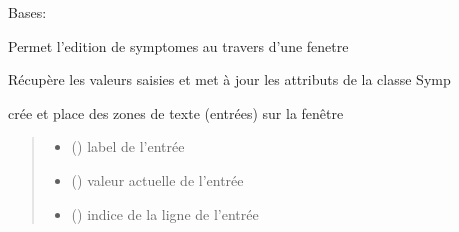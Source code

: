 \documentclass[letterpaper,10pt,english]{sphinxmanual}
\begin{document}
\begin{fulllineitems}
\label{\detokenize{annotation:annotation.pop_up.SymptomeEditor}}
\pysigstartsignatures
{}
\pysigstopsignatures
\sphinxAtStartPar
Bases: 

\sphinxAtStartPar
Permet l’edition de symptomes au travers d’une fenetre

\begin{fulllineitems}
\label{\detokenize{annotation:annotation.pop_up.SymptomeEditor.apply_changes}}
\pysigstartsignatures
{}
\pysigstopsignatures
\sphinxAtStartPar
Récupère les valeurs saisies et met à jour les attributs de la classe Symp

\end{fulllineitems}


\begin{fulllineitems}
\label{\detokenize{annotation:annotation.pop_up.SymptomeEditor.create_entry}}
\pysigstartsignatures
{}
\pysigstopsignatures
\sphinxAtStartPar
crée et place des zones de texte (entrées) sur la fenêtre
\begin{quote}\begin{description}
\begin{itemize}
\item {} 
\sphinxAtStartPar
{} () \textendash{} label de l’entrée

\item {} 
\sphinxAtStartPar
{} () \textendash{} valeur actuelle de l’entrée

\item {} 
\sphinxAtStartPar
{} () \textendash{} indice de la ligne de l’entrée

\end{itemize}

\end{description}\end{quote}

\end{fulllineitems}


\end{fulllineitems}
\end{document}
